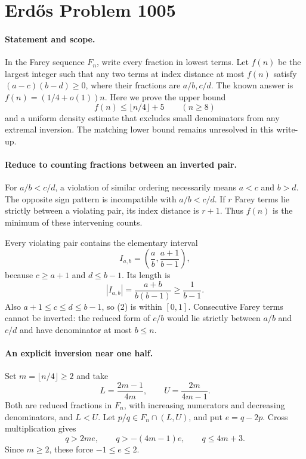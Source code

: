 \section*{Erd\H{o}s Problem 1005}

\paragraph{Statement and scope.}
In the Farey sequence \(F_n\), write every fraction in lowest terms. Let \(f(n)\) be the largest integer such that any two terms at index distance at most \(f(n)\) satisfy
\((a-c)(b-d)\geq0\), where their fractions are \(a/b,c/d\). The known answer is \(f(n)=(1/4+o(1))n\). Here we prove the upper bound
\[
 f(n)\leq\lfloor n/4\rfloor+5\qquad(n\geq8)
\tag{1}
\]
and a uniform density estimate that excludes small denominators from any extremal inversion. The matching lower bound remains unresolved in this write-up.

\paragraph{Reduce to counting fractions between an inverted pair.}
For \(a/b<c/d\), a violation of similar ordering necessarily means \(a<c\) and \(b>d\). The opposite sign pattern is incompatible with \(a/b<c/d\). If \(r\) Farey terms lie strictly between a violating pair, its index distance is \(r+1\). Thus \(f(n)\) is the minimum of these intervening counts.

Every violating pair contains the elementary interval
\[
 I_{a,b}=\left(\frac ab,\frac{a+1}{b-1}\right),
\tag{2}
\]
because \(c\geq a+1\) and \(d\leq b-1\). Its length is
\[
 |I_{a,b}|=\frac{a+b}{b(b-1)}\geq\frac1{b-1}.
\tag{3}
\]
Also \(a+1\leq c\leq d\leq b-1\), so (2) is within \([0,1]\). Consecutive Farey terms cannot be inverted: the reduced form of \(c/b\) would lie strictly between \(a/b\) and \(c/d\) and have denominator at most \(b\leq n\).

\paragraph{An explicit inversion near one half.}
Set \(m=\lfloor n/4\rfloor\geq2\) and take
\[
 L=\frac{2m-1}{4m},\qquad U=\frac{2m}{4m-1}.
\]
Both are reduced fractions in \(F_n\), with increasing numerators and decreasing denominators, and \(L<U\). Let \(p/q\in F_n\cap(L,U)\), and put \(e=q-2p\). Cross multiplication gives
\[
 q>2me,\qquad q>-(4m-1)e,\qquad q\leq4m+3.
\tag{4}
\]
Since \(m\geq2\), these force \(-1\leq e\leq2\).

